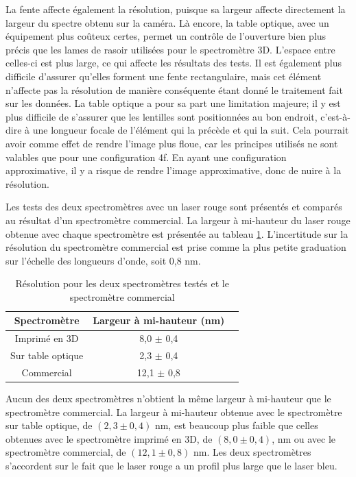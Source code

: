 \documentclass[11pt,letterpaper]{article}
\begin{document}
La fente affecte également la résolution, puisque sa largeur affecte directement la largeur du spectre
obtenu sur la caméra. Là encore, la table optique, avec un équipement plus coûteux certes, permet un
contrôle de l'ouverture bien plus précis que les lames de rasoir utilisées pour le spectromètre 3D.
L'espace entre celles-ci est plus large, ce qui affecte les résultats des tests. Il est également 
plus difficile d'assurer qu'elles forment une fente rectangulaire, mais cet élément n'affecte pas 
la résolution de manière conséquente étant donné le traitement fait sur les données.
La table optique a pour sa part une limitation majeure; il y est plus difficile de s'assurer que les
lentilles sont positionnées au bon endroit, c'est-à-dire à une longueur focale de l'élément qui la 
précède et qui la suit. Cela pourrait avoir comme effet de rendre l'image plus floue, car les principes
utilisés ne sont valables que pour une configuration 4f. En ayant une configuration approximative,
il y a risque de rendre l'image approximative, donc de nuire à la résolution. 

Les tests des deux spectromètres avec un laser rouge sont présentés et comparés au résultat d'un 
spectromètre commercial. La largeur à mi-hauteur du laser rouge obtenue avec chaque spectromètre est 
présentée au tableau \ref{res_tab_rouge}. L'incertitude sur la résolution du spectromètre commercial 
est prise comme la plus petite graduation sur l'échelle des longueurs d'onde, soit 0,8 nm.

\begin{table}[H]
  \centering
  \caption{Résolution pour les deux spectromètres testés et le spectromètre commercial}
  \begin{tabular}{|c|c|c|}\hline
    Spectromètre & Largeur à mi-hauteur (nm) \\
    \hline
    Imprimé en 3D & 8,0 $\pm$ 0,4\\    \hline
    Sur table optique & 2,3 $\pm$ 0,4\\    \hline
    Commercial & 12,1 $\pm$ 0,8\\    \hline
  \end{tabular}
  \label{res_tab_rouge}
\end{table}

Aucun des deux spectromètres n'obtient la même largeur à mi-hauteur que le spectromètre commercial.
La largeur à mi-hauteur obtenue avec le spectromètre sur table optique, de $(2,3 \pm 0,4)$ nm, est 
beaucoup plus faible que celles obtenues avec le spectromètre imprimé en 3D, de $(8,0 \pm 0,4)$, nm 
ou avec le spectromètre commercial, de $(12,1 \pm 0,8)$ nm. Les deux spectromètres s'accordent sur 
le fait que le laser rouge a un profil plus large que le laser bleu.
\end{document}
